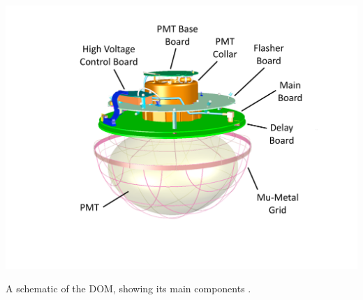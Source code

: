 \begin{marginfigure}
	\includegraphics{./figures/nu_in_icecube/domfig1a-DOM3DModel.pdf}
	\caption{A schematic of the DOM, showing its main components \cite{Aartsen_2017}.}
\end{marginfigure}


